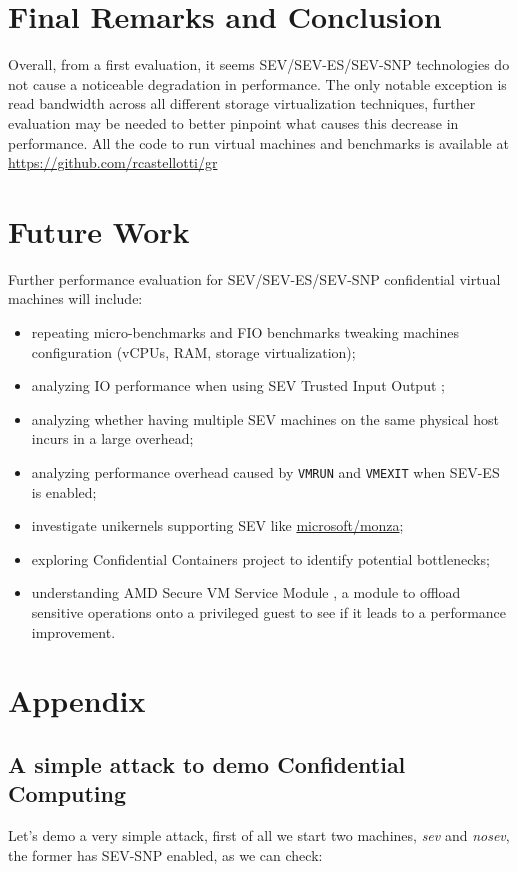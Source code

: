 \documentclass[twocolumn]{article}
\begin{document}
\section{Final Remarks and Conclusion}
Overall, from a first evaluation, it seems SEV/SEV-ES/SEV-SNP technologies do not cause a noticeable degradation in performance. The only notable exception is read bandwidth across all different storage virtualization techniques, further evaluation may be needed to better pinpoint what causes this decrease in performance.
All the code to run virtual machines and benchmarks is available at \href{https://github.com/rcastellotti/gr}{https://github.com/rcastellotti/gr}

\section{Future Work}
Further performance evaluation for SEV/SEV-ES/SEV-SNP confidential virtual machines will include:

\begin{itemize}
    \item repeating micro-benchmarks and FIO benchmarks tweaking machines configuration (vCPUs, RAM, storage virtualization);
    \item analyzing IO performance when using SEV Trusted Input Output \cite{tio};
    \item analyzing whether having multiple SEV machines on the same physical host incurs in a large overhead;
    \item analyzing performance overhead caused by \texttt{VMRUN} and \texttt{VMEXIT} when SEV-ES is enabled;
    \item investigate unikernels supporting SEV like \href{https://github.com/microsoft/monza}{microsoft/monza};
    \item exploring Confidential Containers \cite{coco} project to identify potential bottlenecks;
    \item understanding AMD Secure VM Service Module \cite{svsm}, a module to offload sensitive operations onto a privileged guest to see if it leads to a performance improvement.
\end{itemize}

    
\printbibliography
\appendix

\section{Appendix}
\label{demoattack}
\subsection{A simple attack to demo Confidential Computing}
Let's demo a very simple attack, first of all we start two machines, \textit{sev} and \textit{nosev}, the former has SEV-SNP enabled, as we can check:
\end{document}
